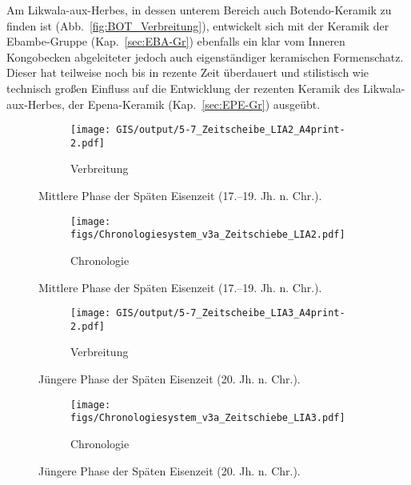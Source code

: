 Am Likwala-aux-Herbes, in dessen unterem Bereich auch Botendo-Keramik zu finden ist (Abb.~\ref{fig:BOT_Verbreitung}), entwickelt sich mit der Keramik der Ebambe-Gruppe (Kap.~\ref{sec:EBA-Gr}) ebenfalls ein klar vom Inneren Kongobecken abgeleiteter jedoch auch eigenständiger keramischen Formenschatz. Dieser hat teilweise noch bis in rezente Zeit überdauert und stilistisch wie technisch großen Einfluss auf die Entwicklung der rezenten Keramik des Likwala-aux-Herbes, der Epena-Keramik (Kap.~\ref{sec:EPE-Gr}) ausgeübt. 

\begin{figure*}[p]
	\centering
	\begin{subfigure}[b]{\textwidth}
		\centering
		\texttt{[image: GIS/output/5-7\_Zeitscheibe\_LIA2\_A4print-2.pdf]}
		\vspace{2cm}
		\caption{Verbreitung}
		\label{fig:LIA2_Karte}
	\end{subfigure}
	\caption{Mittlere Phase der Späten Eisenzeit (17.--19. Jh. n. Chr.).}
	\label{fig:}
\end{figure*}
\addtocounter{figure}{-1}
\begin{figure*}[p]
	\begin{subfigure}[b]{\textwidth}
		\setcounter{subfigure}{1}
		\centering
		\texttt{[image: figs/Chronologiesystem\_v3a\_Zeitschiebe\_LIA2.pdf]}
		\caption{Chronologie}
		\label{fig:LIA2_Chronologie}
	\end{subfigure}
	\caption{Mittlere Phase der Späten Eisenzeit (17.--19. Jh. n. Chr.).}
	\label{fig:LIA2}
\end{figure*}

\begin{figure*}[p]
	\centering
	\begin{subfigure}[b]{\textwidth}
		\centering
		\texttt{[image: GIS/output/5-7\_Zeitscheibe\_LIA3\_A4print-2.pdf]}
		\vspace{2cm}
		\caption{Verbreitung}
		\label{fig:LIA3_Karte}
	\end{subfigure}
	\caption{Jüngere Phase der Späten Eisenzeit (20. Jh. n. Chr.).}
	\label{fig:}
\end{figure*}
\addtocounter{figure}{-1}
\begin{figure*}[p]
	\begin{subfigure}[b]{\textwidth}
		\setcounter{subfigure}{1}
		\centering
		\texttt{[image: figs/Chronologiesystem\_v3a\_Zeitschiebe\_LIA3.pdf]}
		\caption{Chronologie}
		\label{fig:LIA3_Chronologie}
	\end{subfigure}
	\caption{Jüngere Phase der Späten Eisenzeit (20. Jh. n. Chr.).}
	\label{fig:LIA3}
\end{figure*}

